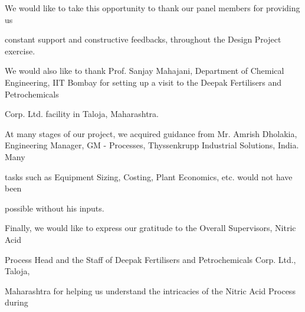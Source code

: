 \documentclass[a4paper,portrait,12pt]{article}
\begin{document}
\begin{flushleft}
We would like to take this opportunity to thank our panel members for providing us
\end{flushleft}


\begin{flushleft}
constant support and constructive feedbacks, throughout the Design Project exercise.
\end{flushleft}





\begin{flushleft}
We would also like to thank Prof. Sanjay Mahajani, Department of Chemical Engineering, IIT Bombay for setting up a visit to the Deepak Fertilisers and Petrochemicals
\end{flushleft}


\begin{flushleft}
Corp. Ltd. facility in Taloja, Maharashtra.
\end{flushleft}





\begin{flushleft}
At many stages of our project, we acquired guidance from Mr. Amrish Dholakia, Engineering Manager, GM - Processes, Thyssenkrupp Industrial Solutions, India. Many
\end{flushleft}


\begin{flushleft}
tasks such as Equipment Sizing, Costing, Plant Economics, etc. would not have been
\end{flushleft}


\begin{flushleft}
possible without his inputs.
\end{flushleft}


\begin{flushleft}
Finally, we would like to express our gratitude to the Overall Supervisors, Nitric Acid
\end{flushleft}


\begin{flushleft}
Process Head and the Staff of Deepak Fertilisers and Petrochemicals Corp. Ltd., Taloja,
\end{flushleft}


\begin{flushleft}
Maharashtra for helping us understand the intricacies of the Nitric Acid Process during
\end{flushleft}
\end{document}
